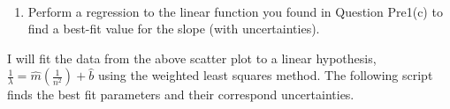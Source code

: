 \documentclass[11pt]{article}
\providecommand{\tightlist}{%
      \setlength{\itemsep}{0pt}\setlength{\parskip}{0pt}}
\begin{document}
    \begin{center}
    \end{center}
    { \hspace*{\fill} \\}
    
    \begin{enumerate}
\def\labelenumi{\alph{enumi})}
\setcounter{enumi}{1}
\tightlist
\item
  Perform a regression to the linear function you found in Question
  Pre1(c) to find a best-fit value for the slope (with uncertainties).
\end{enumerate}

I will fit the data from the above scatter plot to a linear hypothesis,
\(\displaystyle \frac{1}{\lambda} = \hat{m}\left(\frac{1}{n^2}\right) + \hat{b}\)
using the weighted least squares method. The following script finds the
best fit parameters and their correspond uncertainties.
\end{document}
